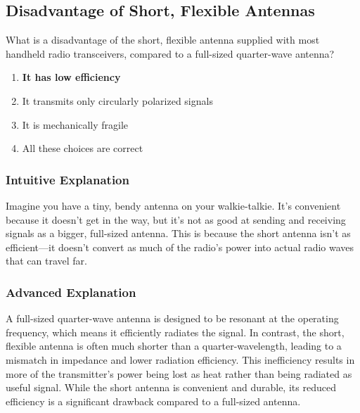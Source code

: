 \subsection{Disadvantage of Short, Flexible Antennas}
\label{T9A04}

\begin{tcolorbox}[colback=gray!10!white,colframe=black!75!black,title=T9A04]
What is a disadvantage of the short, flexible antenna supplied with most handheld radio transceivers, compared to a full-sized quarter-wave antenna?
\begin{enumerate}[noitemsep]
    \item \textbf{It has low efficiency}
    \item It transmits only circularly polarized signals
    \item It is mechanically fragile
    \item All these choices are correct
\end{enumerate}
\end{tcolorbox}

\subsubsection*{Intuitive Explanation}
Imagine you have a tiny, bendy antenna on your walkie-talkie. It's convenient because it doesn't get in the way, but it's not as good at sending and receiving signals as a bigger, full-sized antenna. This is because the short antenna isn't as efficient—it doesn't convert as much of the radio's power into actual radio waves that can travel far.

\subsubsection*{Advanced Explanation}
A full-sized quarter-wave antenna is designed to be resonant at the operating frequency, which means it efficiently radiates the signal. In contrast, the short, flexible antenna is often much shorter than a quarter-wavelength, leading to a mismatch in impedance and lower radiation efficiency. This inefficiency results in more of the transmitter's power being lost as heat rather than being radiated as useful signal. While the short antenna is convenient and durable, its reduced efficiency is a significant drawback compared to a full-sized antenna.